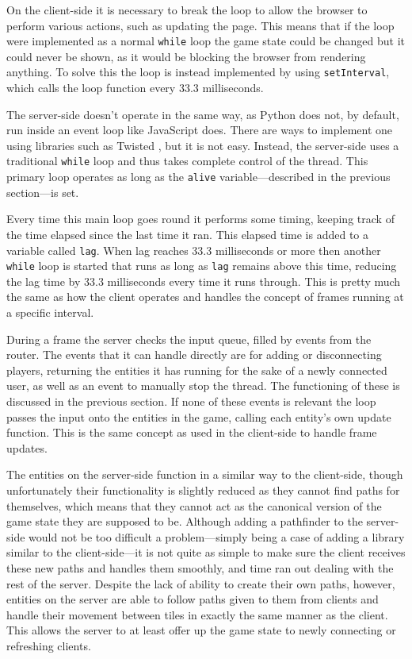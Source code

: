 On the client-side it is necessary to break the loop to allow the browser to perform various actions, such as updating the page. This means that if the loop were implemented as a normal \texttt{while} loop the game state could be changed but it could never be shown, as it would be blocking the browser from rendering anything. To solve this the loop is instead implemented by using \texttt{setInterval}, which calls the loop function every 33.3 milliseconds.

The server-side doesn't operate in the same way, as Python does not, by default, run inside an event loop like JavaScript does. There are ways to implement one using libraries such as Twisted , but it is not easy. Instead, the server-side uses a traditional \texttt{while} loop and thus takes complete control of the thread. This primary loop operates as long as the \texttt{alive} variable---described in the previous section---is set.

Every time this main loop goes round it performs some timing, keeping track of the time elapsed since the last time it ran. This elapsed time is added to a variable called \texttt{lag}. When lag reaches 33.3 milliseconds or more then another \texttt{while} loop is started that runs as long as \texttt{lag} remains above this time, reducing the lag time by 33.3 milliseconds every time it runs through. This is pretty much the same as how the client operates and handles the concept of frames running at a specific interval.

During a frame the server checks the input queue, filled by events from the router. The events that it can handle directly are for adding or disconnecting players, returning the entities it has running for the sake of a newly connected user, as well as an event to manually stop the thread. The functioning of these is discussed in the previous section. If none of these events is relevant the loop passes the input onto the entities in the game, calling each entity's own update function. This is the same concept as used in the client-side to handle frame updates.

The entities on the server-side function in a similar way to the client-side, though unfortunately their functionality is slightly reduced as they cannot find paths for themselves, which means that they cannot act as the canonical version of the game state they are supposed to be. Although adding a pathfinder to the server-side would not be too difficult a problem---simply being a case of adding a library similar to the client-side---it is not quite as simple to make sure the client receives these new paths and handles them smoothly, and time ran out dealing with the rest of the server. Despite the lack of ability to create their own paths, however, entities on the server are able to follow paths given to them from clients and handle their movement between tiles in exactly the same manner as the client. This allows the server to at least offer up the game state to newly connecting or refreshing clients.






